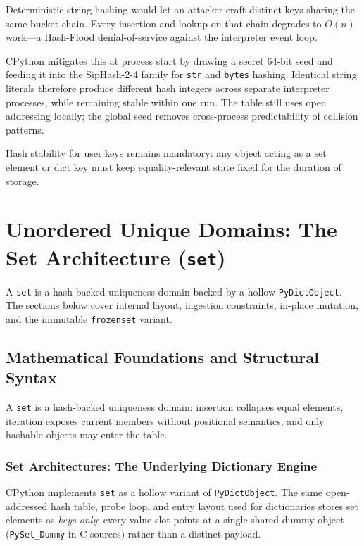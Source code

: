 \documentclass[a4paper,twoside]{report}
\begin{document}
Deterministic string hashing would let an attacker craft distinct keys sharing the same bucket chain. Every insertion and lookup on that chain degrades to $O(n)$ work---a Hash-Flood denial-of-service against the interpreter event loop.

CPython mitigates this at process start by drawing a secret 64-bit seed and feeding it into the SipHash-2-4 family for \texttt{str} and \texttt{bytes} hashing. Identical string literals therefore produce different hash integers across separate interpreter processes, while remaining stable within one run. The table still uses open addressing locally; the global seed removes cross-process predictability of collision patterns.

Hash stability for user keys remains mandatory: any object acting as a set element or dict key must keep equality-relevant state fixed for the duration of storage.


\section{Unordered Unique Domains: The Set Architecture (\texttt{set})}

A \texttt{set} is a hash-backed uniqueness domain backed by a hollow \texttt{PyDictObject}. The sections below cover internal layout, ingestion constraints, in-place mutation, and the immutable \texttt{frozenset} variant.


\subsection{Mathematical Foundations and Structural Syntax}

A \texttt{set} is a hash-backed uniqueness domain: insertion collapses equal elements, iteration exposes current members without positional semantics, and only hashable objects may enter the table.

\subsubsection{Set Architectures: The Underlying Dictionary Engine}

CPython implements \texttt{set} as a hollow variant of \texttt{PyDictObject}. The same open-addressed hash table, probe loop, and entry layout used for dictionaries stores set elements as \emph{keys only}; every value slot points at a single shared dummy object (\texttt{PySet\_Dummy} in C sources) rather than a distinct payload.
\end{document}
